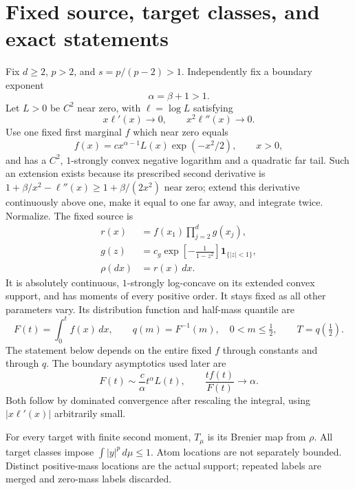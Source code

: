 
\section{Fixed source, target classes, and exact statements}

Fix $d\ge2$, $p>2$, and $s=p/(p-2)>1$. Independently fix a boundary exponent
\[
  \alpha=\beta+1>1.
\]
Let $L>0$ be $C^2$ near zero, with $\ell=\log L$ satisfying
\begin{equation}
  x\ell'(x)\longrightarrow0,
  \qquad x^2\ell''(x)\longrightarrow0.
  \tag{SV}\label{eq:sv}
\end{equation}
Use one fixed first marginal $f$ which near zero equals
\[
  f(x)=c x^{\alpha-1}L(x)\exp(-x^2/2),\qquad x>0,
\]
and has a $C^2$, $1$-strongly convex negative logarithm and a quadratic far tail.
Such an extension exists because its prescribed second derivative is
$1+\beta/x^2-\ell''(x)\ge1+\beta/(2x^2)$ near zero; extend this derivative continuously above one, make it equal to one far away, and integrate twice. Normalize. The fixed source is
\[
  \begin{aligned}
  r(x)&=f(x_1)\prod_{j=2}^d g(x_j),\\
  g(z)&=c_g\exp\!\left[-\frac{1}{1-z^2}\right]\mathbf{1}_{\{|z|<1\}},\\
  \rho(dx)&=r(x)\,dx.
  \end{aligned}
\]
It is absolutely continuous, $1$-strongly log-concave on its extended convex support, and has moments of every positive order. It stays fixed as all other parameters vary. Its distribution function and half-mass quantile are
\[
  F(t)=\int_0^t f(x)\,dx,
  \qquad q(m)=F^{-1}(m),\quad 0<m\le\tfrac12,
  \qquad T=q(\tfrac12).
\]
The statement below depends on the entire fixed $f$ through constants and through $q$. The boundary asymptotics used later are
\begin{equation}
  F(t)\sim\frac{c}{\alpha}t^\alpha L(t),
  \qquad \frac{tf(t)}{F(t)}\longrightarrow\alpha.
  \tag{1.1}\label{eq:1.1}
\end{equation}
Both follow by dominated convergence after rescaling the integral, using $|x\ell'(x)|$ arbitrarily small.

For every target with finite second moment, $T_\mu$ is its Brenier map from $\rho$. All target classes impose $\int |y|^p\,d\mu\le1$. Atom locations are not separately bounded. Distinct positive-mass locations are the actual support; repeated labels are merged and zero-mass labels discarded.

